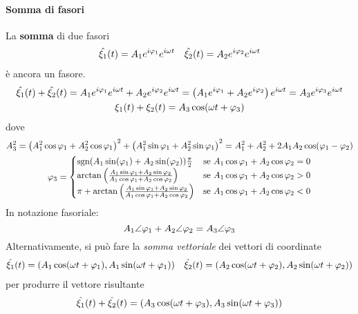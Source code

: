 \paragraph{Somma di fasori}
La \textbf{somma} di due fasori
\begin{align*}
	\hat{\xi_1}(t)=A_1e^{i\oldphi_1}e^{i\omega t}&&\hat{\xi_2}(t)=A_2e^{i\oldphi_2}e^{i\omega t}
\end{align*}
è ancora un fasore.
\begin{gather}
	\hat{\xi_1}(t)+\hat{\xi_2}(t)=A_1e^{i\oldphi_1}e^{i\omega t}+A_2e^{i\oldphi_2}e^{i\omega t}=\left(A_1e^{i\oldphi_1}+A_2e^{i\oldphi_2}\right)e^{i\omega t}=A_3e^{i\oldphi_3}e^{i\omega t}\\
	\xi_1(t)+\xi_2(t)=A_3\cos(\omega t+\oldphi_3)
\end{gather}
dove
\begin{gather*}
	A_3^2=\left(A_1^2\cos\oldphi_1+A_2^2\cos\oldphi_1\right)^2+\left(A_1^2\sin\oldphi_1+A_2^2\sin\oldphi_1\right)^2=A_1^2+A_2^2+2A_1A_2\cos(\oldphi_1-\oldphi_2)\\
	\oldphi_3=\begin{cases}
		\textrm{sgn}(A_1 \sin(\oldphi_1)  + A_2 \sin(\oldphi_2)) \frac{\pi}{2}&\text{se}\ A_1 \cos\oldphi_1 + A_2 \cos\oldphi_2 = 0\\
		\arctan\left(\frac{A_1 \sin\oldphi_1 + A_2 \sin\oldphi_2}{A_1 \cos\oldphi_1 + A_2 \cos\oldphi_2}\right)&\text{se}\ A_1 \cos\oldphi_1 + A_2 \cos\oldphi_2 >0\\
		\pi + \arctan\left(\frac{A_1 \sin\oldphi_1 + A_2 \sin\oldphi_2}{A_1 \cos\oldphi_1 + A_2 \cos\oldphi_2}\right) &\text{se}\ A_1 \cos\oldphi_1 + A_2 \cos\oldphi_2 <0
	\end{cases}
\end{gather*}
In notazione fasoriale:
\begin{equation}
	A_1\angle\oldphi_1+A_2\angle\oldphi_2=A_3\angle\oldphi_3
\end{equation}
Alternativamente, si può fare la \textit{somma vettoriale} dei vettori di coordinate
\begin{align*}
	\hat{\xi_1}(t)=\left(A_1\cos(\omega t+\oldphi_1),A_1\sin(\omega t+\oldphi_1)\right)&&
	\hat{\xi_2}(t)=\left(A_2\cos(\omega t+\oldphi_2),A_2\sin(\omega t+\oldphi_2)\right)
\end{align*}
per produrre il vettore risultante
\begin{equation*}
	\hat{\xi_1}(t)+\hat{\xi_2}(t)=\left(A_3\cos(\omega t+\oldphi_3),A_3\sin(\omega t+\oldphi_3)\right)
\end{equation*}
